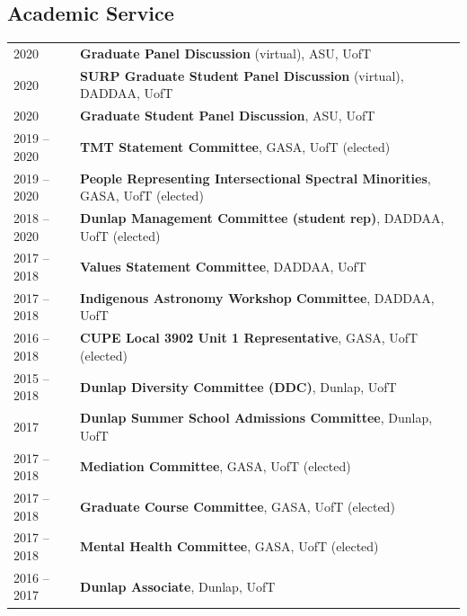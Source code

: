 \documentclass[10pt]{res} %
\begin{document}
\begin{resume}

\newpage
\section{\Large Academic Service}
\vspace{-5pt} %
\noindent\makebox[\linewidth]{\rule{\textwidth}{0.4pt}}
\vspace{-20pt} %

\begin{table}[h!]
\begin{tabularx}{\textwidth}{lX}
2020 & \textbf{Graduate Panel Discussion} (virtual), ASU, UofT \\
2020 & \textbf{SURP Graduate Student Panel Discussion} (virtual), DADDAA, UofT \\
2020 & \textbf{Graduate Student Panel Discussion}, ASU, UofT \\
2019 -- 2020 & \textbf{TMT Statement Committee}, GASA, UofT (elected) \\
2019 -- 2020 & \textbf{People Representing Intersectional Spectral Minorities}, GASA, UofT (elected) \\
2018 -- 2020 & \textbf{Dunlap Management Committee (student rep)}, DADDAA, UofT (elected) \\
2017 -- 2018 & \textbf{Values Statement Committee}, DADDAA, UofT \\
2017 -- 2018 & \textbf{Indigenous Astronomy  Workshop Committee}, DADDAA, UofT \\
2016 --  2018 & \textbf{CUPE Local 3902 Unit 1 Representative}, GASA, UofT (elected) \\
2015 --  2018 & \textbf{Dunlap Diversity Committee (DDC)}, Dunlap, UofT \\
2017 & \textbf{Dunlap Summer School Admissions Committee}, Dunlap, UofT \\
2017 -- 2018 & \textbf{Mediation Committee}, GASA, UofT (elected) \\
2017 -- 2018 & \textbf{Graduate Course Committee}, GASA, UofT (elected) \\
2017 -- 2018 & \textbf{Mental Health Committee}, GASA, UofT (elected) \\
2016 --  2017 & \textbf{Dunlap Associate}, Dunlap, UofT
\end{tabularx}
\end{table}


\end{resume}
\end{document}
